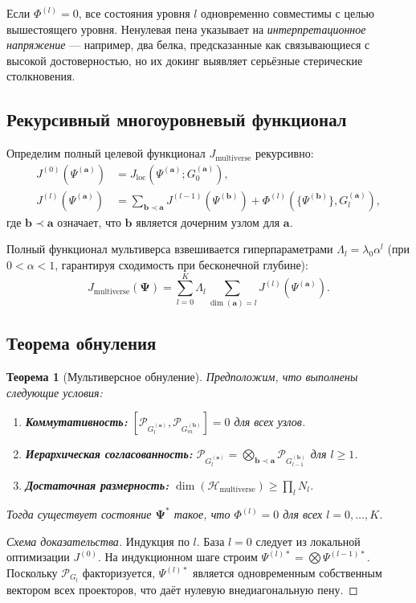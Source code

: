 \documentclass[11pt]{article}
\newtheorem{theorem}{Теорема}[section]
\newcommand{\cP}{\mathcal{P}}
\newcommand{\cH}{\mathcal{H}}
\begin{document}
Если \(\Phi^{(l)} = 0\), все состояния уровня \(l\) одновременно совместимы с целью вышестоящего уровня. Ненулевая пена указывает на \emph{интерпретационное напряжение} — например, два белка, предсказанные как связывающиеся с высокой достоверностью, но их докинг выявляет серьёзные стерические столкновения.

\subsection{Рекурсивный многоуровневый функционал}

Определим полный целевой функционал \(J_{\text{multiverse}}\) рекурсивно:
\begin{align}
J^{(0)}(\Psi^{(\mathbf{a})}) &= J_{\text{loc}}(\Psi^{(\mathbf{a})}; G_0^{(\mathbf{a})}), \\
J^{(l)}(\Psi^{(\mathbf{a})}) &= \sum_{\mathbf{b} \prec \mathbf{a}} J^{(l-1)}(\Psi^{(\mathbf{b})}) + \Phi^{(l)}(\{\Psi^{(\mathbf{b})}\}, G_l^{(\mathbf{a})}),
\end{align}
где \(\mathbf{b} \prec \mathbf{a}\) означает, что \(\mathbf{b}\) является дочерним узлом для \(\mathbf{a}\).

Полный функционал мультиверса взвешивается гиперпараметрами \(\Lambda_l = \lambda_0 \alpha^l\) (при \(0<\alpha<1\), гарантируя сходимость при бесконечной глубине):
\begin{equation}
\boxed{J_{\text{multiverse}}(\mathbf{\Psi}) = \sum_{l=0}^{K} \Lambda_l \sum_{\dim(\mathbf{a})=l} J^{(l)}(\Psi^{(\mathbf{a})}).}
\end{equation}

\subsection{Теорема обнуления}

\begin{theorem}[Мультиверсное обнуление]
Предположим, что выполнены следующие условия:
\begin{enumerate}[label=(\arabic*)]
    \item \textbf{Коммутативность:} \([\cP_{G_l^{(\mathbf{a})}}, \cP_{G_m^{(\mathbf{b})}}] = 0\) для всех узлов.
    \item \textbf{Иерархическая согласованность:} \(\cP_{G_l^{(\mathbf{a})}} = \bigotimes_{\mathbf{b}\prec\mathbf{a}} \cP_{G_{l-1}^{(\mathbf{b})}}\) для \(l \ge 1\).
    \item \textbf{Достаточная размерность:} \(\dim(\cH_{\text{multiverse}}) \ge \prod_l N_l\).
\end{enumerate}
Тогда существует состояние \(\mathbf{\Psi}^*\) такое, что \(\Phi^{(l)} = 0\) для всех \(l = 0,\dots,K\).
\end{theorem}
\begin{proof}[Схема доказательства]
Индукция по \(l\). База \(l=0\) следует из локальной оптимизации \(J^{(0)}\). На индукционном шаге строим \(\Psi^{(l)*} = \bigotimes \Psi^{(l-1)*}\). Поскольку \(\cP_{G_l}\) факторизуется, \(\Psi^{(l)*}\) является одновременным собственным вектором всех проекторов, что даёт нулевую внедиагональную пену.
\end{proof}
\end{document}
